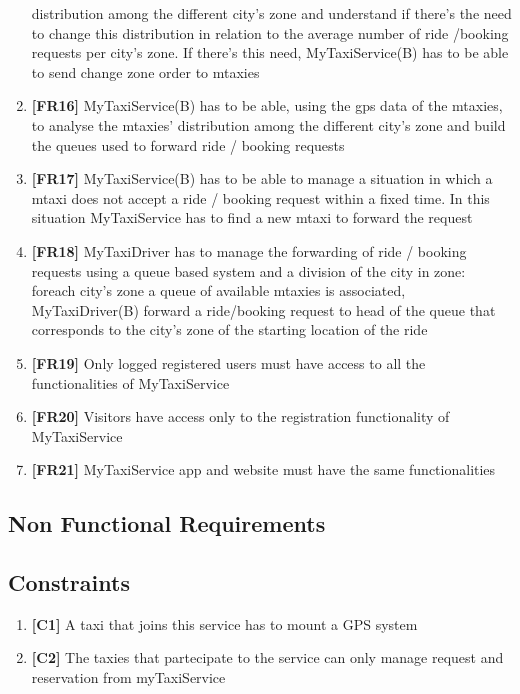 \documentclass[11pt]{article} %
\begin{document}
\begin{enumerate}
      		distribution among the different city's zone and understand if there's the need to change this
      		distribution in relation to the average number of ride /booking requests per city's zone.
      		If there's this need, MyTaxiService(B) has to be able to send change zone order to mtaxies
      	\item \textbf{[FR16] }MyTaxiService(B) has to be able, using the gps data of the mtaxies, to analyse the mtaxies'
      		distribution among the different city's zone and build the queues used to forward ride / booking
      		requests
      	\item \textbf{[FR17] }MyTaxiService(B) has to be able to manage a situation in which a mtaxi does not accept a ride / booking request within a fixed time.
      		In this situation MyTaxiService has to find a new mtaxi to forward the request
      	\item \textbf{[FR18] }MyTaxiDriver has to manage the forwarding of ride / booking requests using a queue based system and
      		a division of the city in zone: foreach city's zone a queue of available mtaxies is associated,
     		MyTaxiDriver(B) forward a ride/booking request to head of the queue that corresponds to the city's
      		zone of the starting location of the ride
      	\item \textbf{[FR19] }Only logged registered users must have access to all the functionalities of MyTaxiService
      	\item \textbf{[FR20] }Visitors have access only to the registration functionality of MyTaxiService
      	\item \textbf{[FR21] }MyTaxiService app and website must have the same functionalities
      	\end{enumerate}


    \subsection {Non Functional Requirements}

    \subsection {Constraints}
    \begin{enumerate}
	\item \textbf{[C1]} A taxi that joins this service has to mount a GPS system
        	\item \textbf{[C2]} The taxies that partecipate to the service can only manage request and reservation from myTaxiService
    \end{enumerate}
\end{document}
